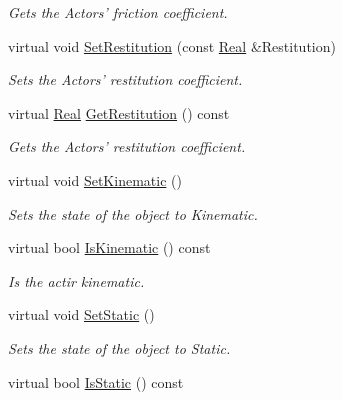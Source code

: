 \begin{DoxyCompactItemize}
\begin{DoxyCompactList}\small\item\em Gets the Actors' friction coefficient. \item\end{DoxyCompactList}\item 
virtual void \hyperlink{classphys_1_1ActorBasePhysicsSettings_ab379008b313aeeecfe82f641ce8b6305}{SetRestitution} (const \hyperlink{namespacephys_af7eb897198d265b8e868f45240230d5f}{Real} \&Restitution)
\begin{DoxyCompactList}\small\item\em Sets the Actors' restitution coefficient. \item\end{DoxyCompactList}\item 
virtual \hyperlink{namespacephys_af7eb897198d265b8e868f45240230d5f}{Real} \hyperlink{classphys_1_1ActorBasePhysicsSettings_a937e66bb0293c4162fae48d9e37196f4}{GetRestitution} () const 
\begin{DoxyCompactList}\small\item\em Gets the Actors' restitution coefficient. \item\end{DoxyCompactList}\item 
virtual void \hyperlink{classphys_1_1ActorBasePhysicsSettings_a3e2a58dbbe32fd193f80821e8dd6e7f5}{SetKinematic} ()
\begin{DoxyCompactList}\small\item\em Sets the state of the object to Kinematic. \item\end{DoxyCompactList}\item 
virtual bool \hyperlink{classphys_1_1ActorBasePhysicsSettings_a8128bcfc407909a57026eb38812b1d1d}{IsKinematic} () const 
\begin{DoxyCompactList}\small\item\em Is the actir kinematic. \item\end{DoxyCompactList}\item 
virtual void \hyperlink{classphys_1_1ActorBasePhysicsSettings_a20addfbc6cdfdc7d6f7847a8695f1172}{SetStatic} ()
\begin{DoxyCompactList}\small\item\em Sets the state of the object to Static. \item\end{DoxyCompactList}\item 
virtual bool \hyperlink{classphys_1_1ActorBasePhysicsSettings_a68c32cbe7329e138c5ea11c5b098483f}{IsStatic} () const 

\end{DoxyCompactItemize}
